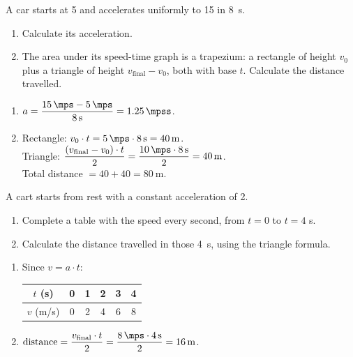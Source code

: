 \begin{exercise}
    A car starts at \qty{5}{\mps} and accelerates uniformly to \qty{15}{\mps} in \qty{8}{\s}.
    \begin{enumerate}[label=\letraminuscula]
        \item Calculate its acceleration.
        \item The area under its speed-time graph is a trapezium: a rectangle of height \(v_0\) plus a triangle of height \(v_{\text{final}} - v_0\), both with base \(t\). Calculate the distance travelled.
    \end{enumerate}
    \begin{solu}
        \begin{enumerate}[label=\alph*)]
            \item \(a = \dfrac{\qty{15}{\mps} - \qty{5}{\mps}}{\qty{8}{\s}} = \qty{1.25}{\mpss}\).
            \item Rectangle: \(v_0 \cdot t = \qty{5}{\mps} \cdot \qty{8}{\s} = \qty{40}{\m}\). \\
            Triangle: \(\dfrac{(v_{\text{final}}-v_0)\cdot t}{2} = \dfrac{\qty{10}{\mps} \cdot \qty{8}{\s}}{2} = \qty{40}{\m}\). \\
            Total distance \(= 40 + 40 = \qty{80}{\m}\).
        \end{enumerate}
    \end{solu}
\end{exercise}

\begin{exercise}
    A cart starts from rest with a constant acceleration of \qty{2}{\mpss}.
    \begin{enumerate}[label=\letraminuscula]
        \item Complete a table with the speed every second, from \(t=0\) to \(t=4\) s.
        \item Calculate the distance travelled in those \qty{4}{\s}, using the triangle formula.
    \end{enumerate}
    \begin{solu}
        \begin{enumerate}[label=\alph*)]
            \item Since \(v = a \cdot t\):
            \begin{center}
                \begin{tabular}{cccccc}
                    \toprule
                    \(t\) (s) & 0 & 1 & 2 & 3 & 4 \\
                    \midrule
                    \(v\) (m/s) & 0 & 2 & 4 & 6 & 8 \\
                    \bottomrule
                \end{tabular}
            \end{center}
            \item \(\text{distance} = \dfrac{v_{\text{final}} \cdot t}{2} = \dfrac{\qty{8}{\mps} \cdot \qty{4}{\s}}{2} = \qty{16}{\m}\).
        \end{enumerate}
    \end{solu}
\end{exercise}

